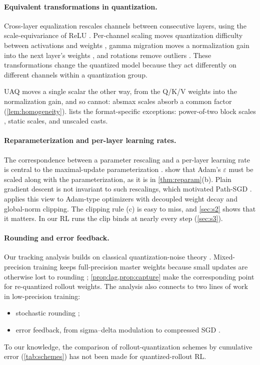 \paragraph{Equivalent transformations in quantization.} Cross-layer equalization rescales channels between consecutive layers, using the scale-equivariance of ReLU \citep{nagel2019datafree}. Per-channel scaling moves quantization difficulty between activations and weights \citep{xiao2023smoothquant,lin2024awq}, gamma migration moves a normalization gain into the next layer's weights \citep{wei2022outlier}, and rotations remove outliers \citep{ashkboos2024quarot}. These transformations change the quantized model because they act differently on different channels within a quantization group.

UAQ moves a single scalar the other way, from the Q/K/V weights into the normalization gain, and so cannot: absmax scales absorb a common factor (\cref{lem:homogeneity}).  lists the format-specific exceptions: power-of-two block scales \citep{rouhani2023mx}, static scales, and unscaled casts.

\paragraph{Reparameterization and per-layer learning rates.} The correspondence between a parameter rescaling and a per-layer learning rate is central to the maximal-update parameterization \citep{yang2021tp4,yang2022tp5}. \citet{everett2024scaling} show that Adam's $\varepsilon$ must be scaled along with the parameterization, as it is in \cref{thm:reparam}(b). Plain gradient descent is not invariant to such rescalings, which motivated Path-SGD \citep{neyshabur2015pathsgd}.  applies this view to Adam-type optimizers \citep{kingma2015adam,loshchilov2019adamw} with decoupled weight decay and global-norm clipping. The clipping rule (c) is easy to miss, and \cref{sec:s2} shows that it matters. In our RL runs the clip binds at nearly every step (\cref{sec:s3}).

\paragraph{Rounding and error feedback.} Our tracking analysis builds on classical quantization-noise theory \citep{widrow2008quantization,sripad1977necessary}. Mixed-precision training keeps full-precision master weights because small updates are otherwise lost to rounding \citep{micikevicius2018mixed}; \cref{prop:lag,prop:capture} make the corresponding point for re-quantized rollout weights. The analysis also connects to two lines of work in low-precision training:
\begin{itemize}[leftmargin=*,itemsep=1pt]
\item stochastic rounding \citep{gupta2015limited,li2017training,desa2018halp,ozkara2025stochastic};
\item error feedback, from sigma--delta modulation \citep{gray1990spectra} to compressed SGD \citep{seide2014onebit,stich2018sparsified,karimireddy2019ef}.
\end{itemize}
To our knowledge, the comparison of rollout-quantization schemes by cumulative error (\cref{tab:schemes}) has not been made for quantized-rollout RL.
